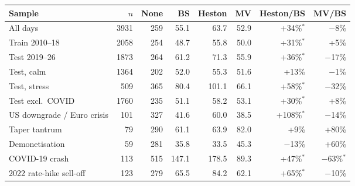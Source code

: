 \begin{tabular}{lrrrrrrr}
\toprule
Sample & $n$ & None & BS & Heston & MV & Heston/BS & MV/BS \\
\midrule
All days & 3931 & 259 & 55.1 & 63.7 & 52.9 & +34\%$^{*}$ & $-$8\% \\
Train 2010--18 & 2058 & 254 & 48.7 & 55.8 & 50.0 & +31\%$^{*}$ & +5\% \\
Test 2019--26 & 1873 & 264 & 61.2 & 71.3 & 55.9 & +36\%$^{*}$ & $-$17\% \\
Test, calm & 1364 & 202 & 52.0 & 55.3 & 51.6 & +13\% & $-$1\% \\
Test, stress & 509 & 365 & 80.4 & 101.1 & 66.1 & +58\%$^{*}$ & $-$32\% \\
Test excl.\ COVID & 1760 & 235 & 51.1 & 58.2 & 53.1 & +30\%$^{*}$ & +8\% \\
US downgrade / Euro crisis & 101 & 327 & 41.6 & 60.0 & 38.5 & +108\%$^{*}$ & $-$14\% \\
Taper tantrum & 79 & 290 & 61.1 & 63.9 & 82.0 & +9\% & +80\% \\
Demonetisation & 59 & 281 & 35.8 & 33.5 & 45.3 & $-$13\% & +60\% \\
COVID-19 crash & 113 & 515 & 147.1 & 178.5 & 89.3 & +47\%$^{*}$ & $-$63\%$^{*}$ \\
2022 rate-hike sell-off & 123 & 279 & 65.5 & 84.2 & 62.1 & +65\%$^{*}$ & $-$10\% \\
\bottomrule
\end{tabular}
